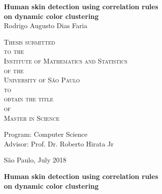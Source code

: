 \documentclass[12pt,twoside,a4paper]{book}
\theoremstyle{plain}
\theoremstyle{definition}
\begin{document}
\frontmatter 
\fancyhead[RO]{{\footnotesize\rightmark}\hspace{2em}\thepage}
\setcounter{tocdepth}{2}
\fancyhead[LE]{\thepage\hspace{2em}\footnotesize{\leftmark}}
\fancyhead[RE,LO]{}
\fancyhead[RO]{{\footnotesize\rightmark}\hspace{2em}\thepage}

\onehalfspacing  %

\thispagestyle{empty}
\begin{center}
    \vspace*{2.3cm}
    \textbf{\Large{Human skin detection using correlation rules\\ on dynamic color clustering}}\\
    
    \vspace*{1.2cm}
    \Large{Rodrigo Augusto Dias Faria}
    
    \vskip 2cm
    \textsc{
    Thesis submitted\\[-0.25cm] 
    to the\\[-0.25cm]
    Institute of Mathematics and Statistics\\[-0.25cm]
    of the\\[-0.25cm]
    University of São Paulo\\[-0.25cm]
    to\\[-0.25cm]
    obtain the title\\[-0.25cm]
    of\\[-0.25cm]
    Master in Science}
    
    \vskip 1.5cm
    Program: Computer Science\\
    Advisor: Prof. Dr. Roberto Hirata Jr

    
    \vskip 1.5cm %
    \normalsize{São Paulo, July 2018}
\end{center}

%
%
%
\newpage
\thispagestyle{empty}
    \begin{center}
        \vspace*{2.3 cm}
        \textbf{\Large{Human skin detection using correlation rules\\ on dynamic color clustering}}\\
        \vspace*{2 cm}
    \end{center}
\end{document}
